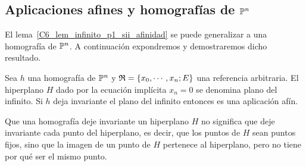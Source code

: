 \subsection{Aplicaciones afines y homografías de $\mathbb{P}^n$}
El lema~\ref{C6_lem_infinito_p1_sii_afinidad} se puede generalizar a una homografía de $\mathbb{P}^n$. A continuación expondremos y demostraremos dicho resultado.

\begin{prop}
	Sea $h$ una homografía de $\mathbb{P}^n$ y $\mathfrak{R}=\{x_0,\cdots,x_n;E\}$ una referencia arbitraria. El hiperplano $H$ dado por la ecuación implícita $x_n=0$ se denomina plano del infinito. Si $h$ deja invariante el plano del infinito entonces es una aplicación afín.
\end{prop}
\begin{obs}
	Que una homografía deje invariante un hiperplano $H$ no significa que deje invariante cada punto del hiperplano, es decir, que los puntos de $H$ sean puntos fijos, sino que la imagen de un punto de $H$ pertenece al hiperplano, pero no tiene por qué ser el mismo punto.
\end{obs}
